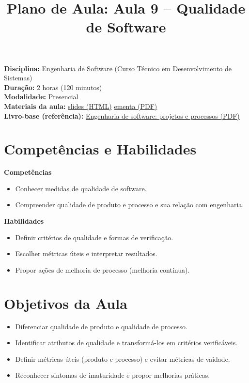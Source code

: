 \documentclass[12pt,a4paper]{article}
\title{Plano de Aula: Aula 9 -- Qualidade de Software}
\date{}
\begin{document}
\maketitle

\noindent
\textbf{Disciplina:} Engenharia de Software (Curso Técnico em Desenvolvimento de Sistemas)\\
\textbf{Duração:} 2 horas (120 minutos)\\
\textbf{Modalidade:} Presencial\\
\textbf{Materiais da aula:} \href{aula-09.html}{slides (HTML)} \quad \href{aula-09.pdf}{ementa (PDF)}\\
\textbf{Livro-base (referência):} \href{../99-Materiais/Engenharia%20de%20software%20projetos%20e%20processos%20by%20Wilson%20de%20P%C3%A1dua%20Paula%20Filho%20.epub.pdf}{Engenharia de software: projetos e processos (PDF)}

\section{Competências e Habilidades}
\textbf{Competências}
\begin{itemize}[leftmargin=*,itemsep=0.25em]
  \item Conhecer medidas de qualidade de software.
  \item Compreender qualidade de produto e processo e sua relação com engenharia.
\end{itemize}

\textbf{Habilidades}
\begin{itemize}[leftmargin=*,itemsep=0.25em]
  \item Definir critérios de qualidade e formas de verificação.
  \item Escolher métricas úteis e interpretar resultados.
  \item Propor ações de melhoria de processo (melhoria contínua).
\end{itemize}

\section{Objetivos da Aula}
\begin{itemize}[leftmargin=*,itemsep=0.25em]
  \item Diferenciar qualidade de produto e qualidade de processo.
  \item Identificar atributos de qualidade e transformá-los em critérios verificáveis.
  \item Definir métricas úteis (produto e processo) e evitar métricas de vaidade.
  \item Reconhecer sintomas de imaturidade e propor melhorias práticas.
\end{itemize}
\end{document}

